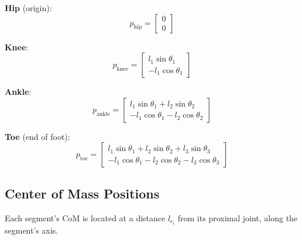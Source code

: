 \documentclass[11pt,a4paper]{article}
\newcommand{\vc}[1]{\bm{#1}}
\def\vc#1{#1}%
\def\bm#1{#1}%
\begin{document}
\begin{keybox}
\textbf{Hip} (origin):
\begin{equation}
    \vc{p}_{\text{hip}} = \begin{bmatrix} 0 \\ 0 \end{bmatrix}
\end{equation}

\textbf{Knee}:
\begin{equation}
    \vc{p}_{\text{knee}} = \begin{bmatrix} l_1 \sin\theta_1 \\ -l_1 \cos\theta_1 \end{bmatrix}
    \label{eq:knee_pos}
\end{equation}

\textbf{Ankle}:
\begin{equation}
    \vc{p}_{\text{ankle}} = \begin{bmatrix}
        l_1 \sin\theta_1 + l_2 \sin\theta_2 \\
        -l_1 \cos\theta_1 - l_2 \cos\theta_2
    \end{bmatrix}
    \label{eq:ankle_pos}
\end{equation}

\textbf{Toe} (end of foot):
\begin{equation}
    \vc{p}_{\text{toe}} = \begin{bmatrix}
        l_1 \sin\theta_1 + l_2 \sin\theta_2 + l_3 \sin\theta_3 \\
        -l_1 \cos\theta_1 - l_2 \cos\theta_2 - l_3 \cos\theta_3
    \end{bmatrix}
    \label{eq:toe_pos}
\end{equation}
\end{keybox}

\subsection{Center of Mass Positions}

Each segment's CoM is located at a distance $l_{c_i}$ from its proximal joint,
along the segment's axis.
\end{document}
